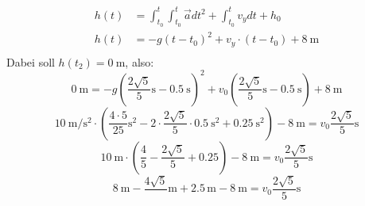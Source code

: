 \documentclass[sectionformat = aufgabe]{gadsescript}
\begin{document}
\begin{enumerate}[label=\alph*)]
		\begin{align*}
			h(t) &= \int_{t_0}^{t} \int_{t_0}^{t} \vec a dt^2 + \int_{t_0}^{t} v_y dt + h_0\\
			h(t) &= - g(t- t_0)^2 + v_y \cdot (t-t_0) + \qty{8}{\metre}\\
		\end{align*}
		Dabei soll $ h(t_2) = \qty{0}{\metre} $, also:
		\[\qty{0}{\metre}  = -g\left(\frac{2\sqrt{5}}{5}\unit{\second} - \qty{0.5}{\second} \right)^2 + v_0 \left(\frac{2\sqrt{5}}{5}\unit{\second} - \qty{0.5}{\second} \right)  + \qty{8}{\metre}\]
		\[ \qty{10}{\metre\per\square\second}\cdot\left(%
			\frac{4\cdot5}{25}\unit{\square\second} - 2\cdot\frac{2\sqrt{5}}{5}\cdot\qty{0.5}{\square\second} + \qty{0.25}{\square\second} \right)%
			- \qty{8}{\metre} = v_0 \frac{2\sqrt{5}}{5}\unit{\second}\]
		\[ \qty{10}{\metre}\cdot\left(\frac{4}{5} - \frac{2\sqrt{5}}{5} + 0.25 \right)-  \qty{8}{\metre} = v_0 \frac{2\sqrt{5}}{5}\unit{\second}\]
		\[ \qty{8}{\metre} - \frac{4\sqrt{5}}\,\unit{\metre} + 2.5\,\unit{\metre} -  \qty{8}{\metre} = v_0 \frac{2\sqrt{5}}{5}\unit{\second}\]
\end{enumerate}
\end{document}

